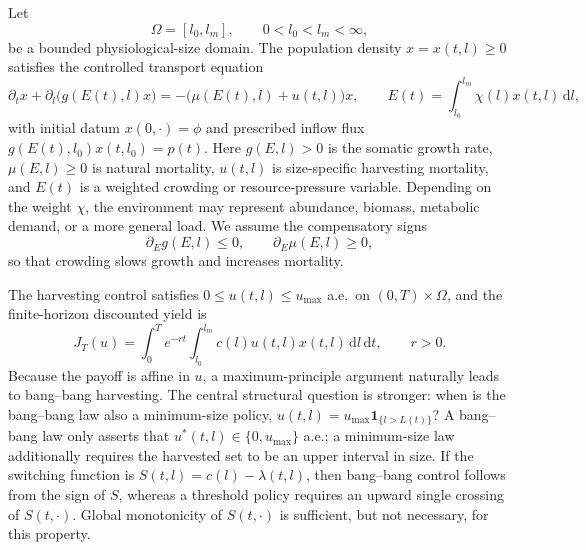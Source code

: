 \documentclass[pdflatex,sn-mathphys-num]{sn-jnl}
\newcommand{\Om}{\Omega}
\newcommand{\dd}{\,\mathrm{d}}
\theoremstyle{plain}
\theoremstyle{definition}
\theoremstyle{remark}
\begin{document}
Let
\[
\Om=[l_0,l_m],\qquad 0<l_0<l_m<\infty,
\]
be a bounded physiological-size domain. The population density
$x=x(t,l)\ge0$ satisfies the controlled transport equation
\cite{perthame2007transport,yu2026rigorous}
\begin{equation}\label{eq:intro_pde}
\partial_t x+\partial_l\!\big(g(E(t),l)x\big)
=
-\big(\mu(E(t),l)+u(t,l)\big)x,
\qquad
E(t)=\int_{l_0}^{l_m}\chi(l)x(t,l)\dd l,
\end{equation}
with initial datum $x(0,\cdot)=\phi$ and prescribed inflow flux
$\displaystyle g(E(t),l_0)x(t,l_0)=p(t)$.
Here $g(E,l)>0$ is the somatic growth rate, $\mu(E,l)\ge0$ is natural mortality,
$u(t,l)$ is size-specific harvesting mortality, and $E(t)$ is a weighted crowding
or resource-pressure variable. Depending on the weight $\chi$, the environment
may represent abundance, biomass, metabolic demand, or a more general load. We
assume the compensatory signs
\begin{equation}\label{eq:intro_signs}
\partial_E g(E,l)\le0,
\qquad
\partial_E\mu(E,l)\ge0,
\end{equation}
so that crowding slows growth and increases mortality.

The harvesting control satisfies $0\le u(t,l)\le u_{\max}$ a.e.\ on
$(0,T)\times\Om$, and the finite-horizon discounted yield is
\begin{equation}\label{eq:intro_J}
J_T(u)
=
\int_0^T e^{-rt}
\int_{l_0}^{l_m}c(l)u(t,l)x(t,l)\dd l\dd t,
\qquad r>0.
\end{equation}
Because the payoff is affine in $u$, a maximum-principle argument naturally leads
to bang--bang harvesting. The central structural question is stronger: when is
the bang--bang law also a minimum-size policy,
$\displaystyle u(t,l)=u_{\max}\mathbf 1_{\{l>L(t)\}}$?
A bang--bang law only asserts that $u^*(t,l)\in\{0,u_{\max}\}$ a.e.; a
minimum-size law additionally requires the harvested set to be an upper interval
in size. If the switching function is
$\displaystyle S(t,l)=c(l)-\lambda(t,l)$,
then bang--bang control follows from the sign of $S$, whereas a threshold policy
requires an upward single crossing of $S(t,\cdot)$. Global monotonicity of
$S(t,\cdot)$ is sufficient, but not necessary, for this property.
\end{document}
